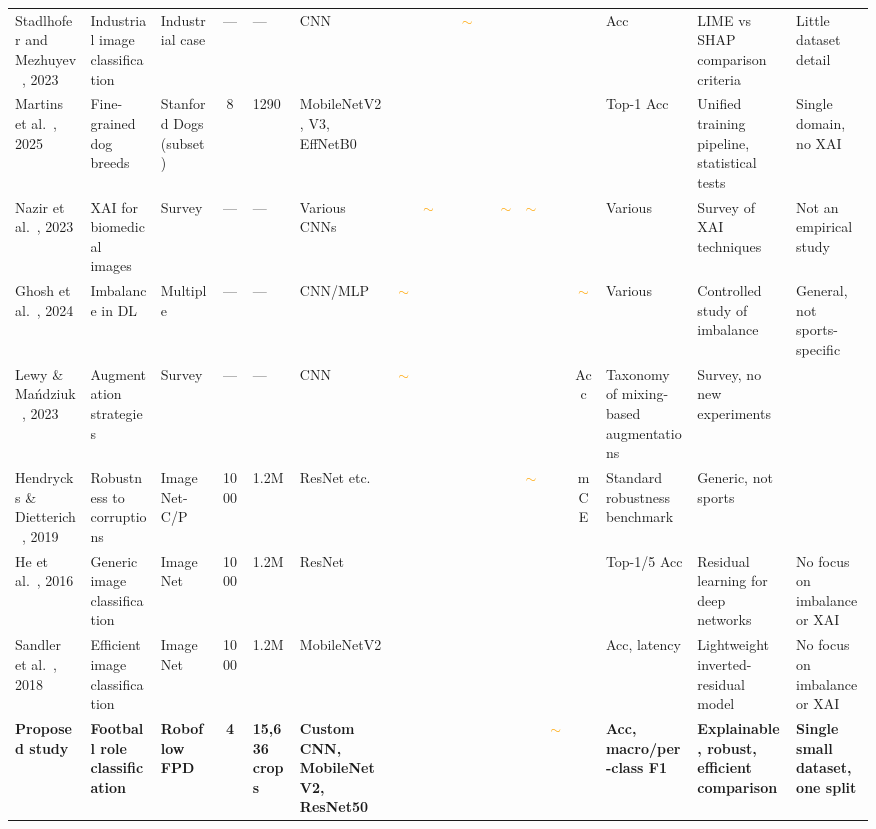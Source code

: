\documentclass[preprint,12pt]{elsarticle}
\newcommand{\cmark}{\ding{51}} %
\newcommand{\xmark}{\ding{55}} %
\newcommand{\pmark}{\textcolor{orange}{$\sim$}} %
\begin{document}
\begin{table}
\begin{tabular}{p{1.6cm} p{1.8cm} p{1.5cm} c p{1.1cm} p{1.7cm} c c c c c c c c c p{1.7cm} p{2.3cm} p{2.3cm}}
Stadlhofer and Mezhuyev~\cite{schorr2023interpretability}, 2023 & Industrial image classification & Industrial case & --- & --- & CNN & \cmark & \xmark & \xmark & \pmark & \cmark & \xmark & \xmark & \xmark & \xmark & Acc & LIME vs SHAP comparison criteria & Little dataset detail \\
Martins et al.~\cite{martins2025mobilenet}, 2025 & Fine-grained dog breeds & Stanford Dogs (subset) & 8 & 1290 & MobileNetV2, V3, EffNetB0 & \cmark & \xmark & \cmark & \xmark & \xmark & \xmark & \xmark & \cmark & \cmark & Top-1 Acc & Unified training pipeline, statistical tests & Single domain, no XAI \\
Nazir et al.~\cite{nazir2023survey}, 2023 & XAI for biomedical images & Survey & --- & --- & Various CNNs & \cmark & \pmark & \cmark & \cmark & \cmark & \pmark & \pmark & \xmark & \xmark & Various & Survey of XAI techniques & Not an empirical study \\
Ghosh et al.~\cite{ghosh2024imbalance}, 2024 & Imbalance in DL & Multiple & --- & --- & CNN/MLP & \pmark & \cmark & \cmark & \xmark & \xmark & \xmark & \xmark & \cmark & \pmark & Various & Controlled study of imbalance & General, not sports-specific \\
Lewy \& Ma\'ndziuk~\cite{lewy2023augmentation}, 2023 & Augmentation strategies & Survey & --- & --- & CNN & \pmark & \cmark & \cmark & \xmark & \xmark & \xmark & \xmark & \xmark & Acc & Taxonomy of mixing-based augmentations & Survey, no new experiments \\
Hendrycks \& Dietterich~\cite{hendrycks2019benchmarking}, 2019 & Robustness to corruptions & ImageNet-C/P & 1000 & 1.2M & ResNet etc. & \cmark & \xmark & \cmark & \xmark & \xmark & \cmark & \pmark & \xmark & mCE & Standard robustness benchmark & Generic, not sports \\
He et al.~\cite{he2016deep}, 2016 & Generic image classification & ImageNet & 1000 & 1.2M & ResNet & \xmark & \xmark & \cmark & \xmark & \xmark & \xmark & \xmark & \xmark & \cmark & Top-1/5 Acc & Residual learning for deep networks & No focus on imbalance or XAI \\
Sandler et al.~\cite{sandler2018mobilenetv2}, 2018 & Efficient image classification & ImageNet & 1000 & 1.2M & MobileNetV2 & \xmark & \xmark & \cmark & \xmark & \xmark & \xmark & \xmark & \xmark & \cmark & Acc, latency & Lightweight inverted-residual model & No focus on imbalance or XAI \\
\textbf{Proposed study} & \textbf{Football role classification} & \textbf{Roboflow FPD} & \textbf{4} & \textbf{15,636 crops} & \textbf{Custom CNN, MobileNetV2, ResNet50} & \cmark & \cmark & \cmark & \cmark & \cmark & \cmark & \xmark & \pmark & \cmark & \textbf{Acc, macro/per-class F1} & \textbf{Explainable, robust, efficient comparison} & \textbf{Single small dataset, one split} \\
\bottomrule
\end{tabular}
\end{table}
\end{document}
